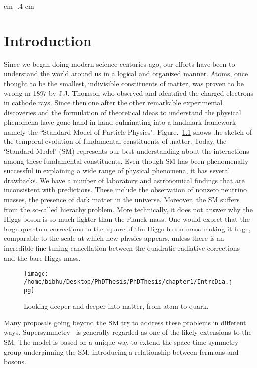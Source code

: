 \setcounter{section}{0}
\setcounter{subsection}{0}
\setcounter{subsubsection}{0}
\setcounter{equation}{0}
\setcounter{page}{1} 
 cm 
\evensidemargin -.4 cm
\setlength{\textwidth}{152.4 mm}
\chapter{Introduction \label{Introduction}}

Since we began doing modern science centuries ago, our efforts have been to understand the world around us in a logical and organized manner. Atoms, once thought to be the smallest, indivisible constituents of matter, was proven to be wrong in 1897 by J.J. Thomson who observed and identified the charged electrons in cathode rays. Since then one after the other remarkable experimental discoveries and the formulation of theoretical ideas to understand the physical phenomena have gone hand in hand culminating into a landmark framework namely the  ``Standard Model of Particle Physics". Figure.~\ref{fig:ParticleIntro} shows the sketch of the temporal evolution of fundamental constituents of matter. Today, the `Standard Model' (SM) represents our best understanding about the interactions among these fundamental constituents. Even though SM has been phenomenally successful in explaining a wide range of physical phenomena, it has several drawbacks. We have a number of laboratory and astronomical findings that are inconsistent with predictions. These  include the observation of nonzero neutrino masses, the presence of dark matter in the universe. Moreover, the SM suffers from the so-called hierachy problem. More technically, it does not answer why the Higgs boson is so much lighter than the Planck mass. One would expect that the large quantum corrections to the square of the Higgs boson mass making it huge, comparable to the scale at which new physics appears, unless there is an incredible fine-tuning cancellation between the quadratic radiative corrections and the bare Higgs mass. 

\begin{figure}[h]
    \centering
    \texttt{[image: /home/bibhu/Desktop/PhDThesis/PhDThesis/chapter1/IntroDia.jpg]}
    \caption{ \small Looking deeper and deeper into matter, from atom to quark.}
    \label{fig:ParticleIntro}
\end{figure}

Many proposals going beyond the SM try to address these problems in different ways.  Supersymmetry~\cite{SUSYtheo} is generally regarded as one of the likely extensions to the SM. The model is based on a unique way to extend the space-time symmetry group
underpinning the SM, introducing a relationship between fermions and bosons.
 

